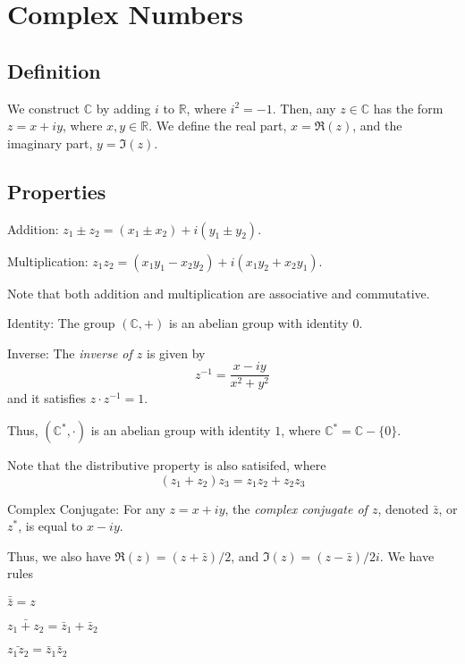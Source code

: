 \documentclass[12pt]{article}
\begin{document}

\section{Complex Numbers}

\subsection{Definition}

We construct $\mathbb{C}$ by adding $i$ to $\mathbb{R}$, where $i^{2} = -1$.
Then, any $z \in \mathbb{C}$ has the form $z = x + iy$, where $x,y \in \mathbb{R}$.
We define the real part, $x = \Re(z)$, and the imaginary part, $y = \Im(z)$.

\subsection{Properties}

\begin{compactenum}[i)]
\item Addition: $z_{1} \pm z_{2} = (x_{1} \pm x_{2}) + i(y_{1} \pm y_{2})$.
\item Multiplication: $z_{1}z_{2} = (x_{1}y_{1} - x_{2}y_{2}) + i(x_{1}y_{2} + x_{2}y_{1})$.
\end{compactenum}
Note that both addition and multiplication are associative and commutative.
\begin{compactenum}[i)]
\setcounter{enumi}{2}
\item Identity: The group $(\mathbb{C},+)$ is an abelian group with identity $0$.
\item Inverse: The \emph{inverse of $z$} is given by
    \[
    z^{-1} = \frac{x - iy}{x^{2} + y^{2}}
    \]
    and it satisfies $z \cdot z^{-1} = 1$.
\end{compactenum}

Thus, $(\mathbb{C}^{*}, \cdot)$ is an abelian group with identity $1$,
where $\mathbb{C}^{*} = \mathbb{C} - \{0\}$.

Note that the distributive property is also satisifed, where
\[
    (z_{1}+z_{2})z_{3} = z_{1}z_{2} + z_{2}z_{3}
\]
\begin{compactenum}[i)]
\setcounter{enumi}{4}
\item Complex Conjugate: For any $z = x + iy$, 
    the \emph{complex conjugate of $z$}, denoted $\bar z$, or $z^{*}$, is equal to $x - iy$.
\end{compactenum}
Thus, we also have $\Re(z) = (z + \bar z) / 2$, and $\Im(z) = (z - \bar z) / 2i$.
We have rules
\begin{compactitem}
\item $\bar {\bar z} = z$
\item $\bar{z_{1} + z_{2}} = \bar z_{1} + \bar z_{2}$
\item $\bar {z_{1}z_{2}} = \bar z_{1} \bar z_{2}$
\end{compactitem}
\end{document}
